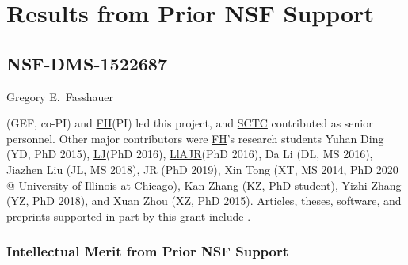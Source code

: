 \documentclass[11pt]{NSFamsart}
\newcommand{\FH}{\hyperlink{FHlink}{FH}\xspace}
\newcommand{\SCTC}{\hyperlink{SCTClink}{SCTC}\xspace}
\newcommand{\LlAJR}{\hyperlink{LlAJRlink}{LlAJR}\xspace}
\newcommand{\LJ}{\hyperlink{LJlink}{LJ}\xspace}
\begin{document}
\section{Results from Prior NSF Support} \label{sec:prior_work}

\subsection{NSF-DMS-1522687
} \label{sec:PreviousFred}

\hypertarget{GEFlink}{Gregory E.\ Fasshauer} (GEF, co-PI) and \FH (PI) led this project, and \SCTC contributed as senior personnel.  Other major contributors were \FH's research students \hypertarget{YDlink}{Yuhan Ding} (YD, PhD 2015), \LJ (PhD 2016), 
\LlAJR (PhD 2016), \hypertarget{DLlink}{Da Li} (DL, MS 2016), \hypertarget{JLlink}{Jiazhen Liu} (JL, MS 2018), JR (PhD 2019), \hypertarget{XTlink}{Xin Tong} (XT, MS 2014, PhD 2020 @ University of Illinois at Chicago), \hypertarget{KZlink}{Kan Zhang} (KZ, PhD student), \hypertarget{YZlink}{Yizhi Zhang} (YZ, PhD 2018), and \hypertarget{XZlink}{Xuan Zhou} (XZ, PhD 2015).  Articles, theses,  
software, and preprints supported in 
part by this 
grant 
include 
\cite{ala_augmented_2017, 
	ChoEtal17a,
	ChoEtal20a,
	Din15a, 
	DinHic20a,
	GilEtal16a,
	Hic17a,
	HicJag18b,
	HicJim16a,
	HicEtal18a,
	HicEtal17a,
	HicKriWoz19a,
	RatHic19a,
	GilJim16b,
	JimHic16a,
	JohFasHic18a,
	Li16a,
	Liu17a,
	MarEtal18a,
	mccourt_stable_2017,
	MCCEtal19a,
	mishra_hybrid_2018,
	MisEtal19a,
	rashidinia_stable_2016,
	rashidinia_stable_2018,
	Zha18a,
	Zha17a,
	Zho15a,
	ZhoHic15a}.

\subsubsection{Intellectual Merit from Prior NSF Support}
\label{previousmeritsubsec}
\phantom{a}
\end{document}
